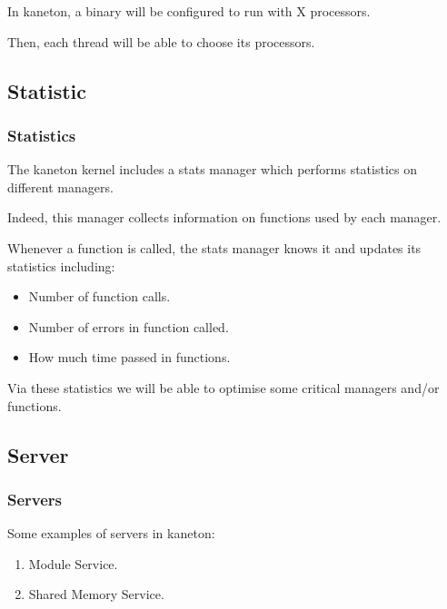 {\begin{frame}
  \nl

  In kaneton, a binary will be configured to run with X processors.

  \nl

  Then, each thread will be able to choose its processors.
\end{frame}

%
%

\subsection{Statistic}


\begin{frame}
  \frametitle{Statistics}

  The kaneton kernel includes a stats manager which performs statistics
  on different managers.

  \nl

  Indeed, this manager collects information on functions used by each
  manager.

  \nl

  Whenever a function is called, the stats manager knows it and updates
  its statistics including:

  \begin{itemize}[<+->]
    \item
      Number of function calls.
    \item
      Number of errors in function called.
    \item
      How much time passed in functions.
  \end{itemize}

  \nl

  Via these statistics we will be able to optimise some critical managers
  and/or functions.
\end{frame}

%
%

\subsection{Server}


\begin{frame}
  \frametitle{Servers}

  Some examples of servers in kaneton:

  \begin{enumerate}[<+->]
    \item
      Module Service.
    \item
      Shared Memory Service.
  \end{enumerate}
\end{frame}

}
